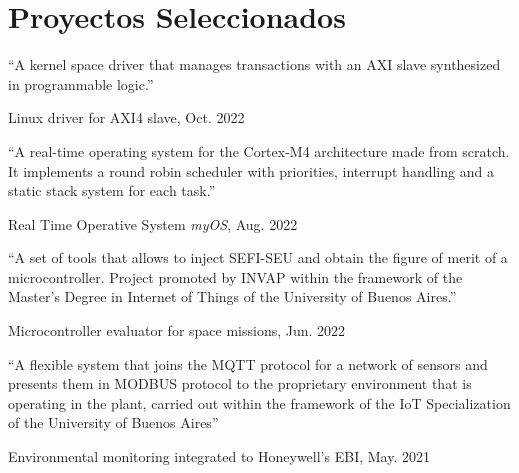 \section{Proyectos Seleccionados}

\newcommand{\pub}[5]{
	\parbox[t][][t]{\linewidth}{%
		\begin{small}
		\parbox{\linewidth}{{``#4''}}
		\smallbreak
		\parbox{\linewidth}{{#2}, {#1}}
		\parbox{\linewidth}{{\href{https://doi.org/#3}{#3}}}
		\end{small}
	}
	\bigbreak
	\smallskip
}

\pub{Oct. 2022}{Linux driver for AXI4 slave}{}{A kernel space driver that manages transactions with an AXI slave synthesized in programmable logic.}{
}

\pub{Aug. 2022}{Real Time Operative System \emph{myOS}}{}{A real-time operating system for the Cortex-M4 architecture made from scratch. It implements a round robin scheduler with priorities, interrupt handling and a static stack system for each task.}{
}

\pub{Jun. 2022}{Microcontroller evaluator for space missions}{}{A set of tools that allows to inject SEFI-SEU and obtain the figure of merit of a microcontroller. Project promoted by INVAP within the framework of the Master's Degree in Internet of Things of the University of Buenos Aires.}{
}

\pub{May. 2021}{Environmental monitoring integrated to Honeywell's EBI}{}{A flexible system that joins the MQTT protocol for a network of sensors and presents them in MODBUS protocol to the proprietary environment that is operating in the plant, carried out within the framework of the IoT Specialization of the University of Buenos Aires}{
}


